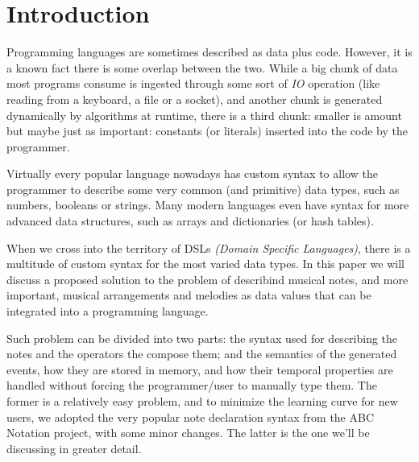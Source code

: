 \documentclass[a4paper,UKenglish,cleveref, autoref]{oasics-v2019}
\title{\ourtitle}
\author{Pedro M. Silva}{Dummy University Computing Laboratory, Portugal \and My second affiliation, Country \and \url{http://www.myhomepage.edu} }{johnqpublic@dummyuni.org}{https://orcid.org/0000-0002-1825-0097}{(Optional) author-specific funding acknowledgements}
\author{José João Almeida}%
       {Algoritmi, Departamento de Informática, Universidade do Minho, Braga, Portugal}%
       {jj@di.uminho.pt}%
       {https://orcid.org/0000-0002-0722-2031}
       {}
\begin{document}
\maketitle

\begin{abstract}
  In this paper, we'll discuss a simple approach to integrating musical events, such as notes or chords, into a programming language. First we'll analyze the problem and it's particular requirements. Then we will discuss the solution we developed to meet those requirements. Finally we'll analyze the result and discuss possible alternative routes we could've taken.
\end{abstract}



\section{Introduction}
Programming languages are sometimes described as data plus code. However, it is a known fact there is some overlap between the two. While a big chunk of data most programs consume is ingested through some sort of \textit{IO} operation (like reading from a keyboard, a file or a socket), and another chunk is generated dynamically by algorithms at runtime, there is a third chunk: smaller is amount but maybe just as important: constants (or literals) inserted into the code by the programmer.

Virtually every popular language nowadays has custom syntax to allow the programmer to describe some very common (and primitive) data types, such as numbers, booleans or strings. Many modern languages even have syntax for more advanced data structures, such as arrays and dictionaries (or hash tables).

When we cross into the territory of DSLs \textit{(Domain Specific Languages)}, there is a multitude of custom syntax for the most varied data types. In this paper we will discuss a proposed solution to the problem of describind musical notes, and more important, musical arrangements and melodies as data values that can be integrated into a programming language.

Such problem can be divided into two parts: the syntax used for describing the notes and the operators the compose them; and the semantics of the generated events, how they are stored in memory, and how their temporal properties are handled without forcing the programmer/user to manually type them. The former is a relatively easy problem, and to minimize the learning curve for new users, we adopted the very popular note declaration syntax from the ABC Notation project, with some minor changes. The latter is the one we'll be discussing in greater detail.
\end{document}
